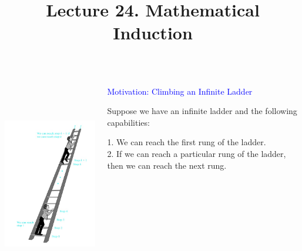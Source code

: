 \documentclass[aspectratio=169]{beamer}
\title{Lecture 24. Mathematical Induction }
\date{ }
\providecommand{\Blue}[1]{\textcolor{blue}{#1}}
\begin{document}
\frame[plain]{\titlepage}

\begin{frame}[plain]{}
     \begin{columns}[t] %
      \begin{column}[T]{5.5cm} %
	  \includegraphics[height=8.8cm]{./img/lecture24-fig1.png}
     \end{column}
     \begin{column}[T]{7.5cm} %
       \vspace{.3in}
       
       
       \Blue{ Motivation: Climbing an Infinite Ladder}
       \medskip
       
        
         Suppose we have an infinite ladder and the following capabilities:\\
         \medskip
         
         1. We can reach the first rung of the ladder.\\
         2. If we can reach a particular rung of the ladder, then we
	    can reach the next rung.
     

     \end{column}
    
     \end{columns}
     
\end{frame}
\end{document}
